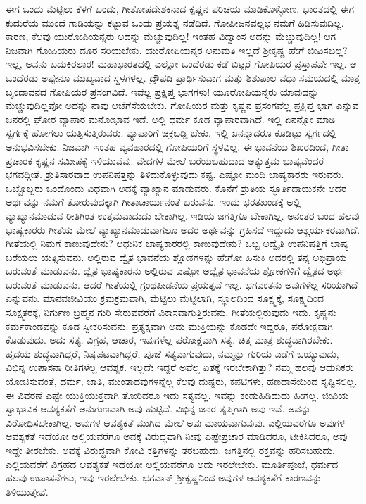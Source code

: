ಈಗ ಒಂದು ಮೆಟ್ಟಿಲು ಕೆಳಗೆ ಬಂದು, ಗೀತೋಪದೇಶಕನಾದ ಕೃಷ್ಣನ ಪರಿಚಯ ಮಾಡಿಕೊಳ್ಳೋಣ. ಭಾರತದಲ್ಲಿ ಈಗ ಕುದುರೆಯ ಮುಂದೆ ಗಾಡಿಯನ್ನು ಕಟ್ಟುವ ಒಂದು ಪ್ರಯತ್ನ ನಡೆದಿದೆ. ಗೋಪೀಜನವಲ್ಲಭ ನಮಗೆ ಹಿಡಿಸುವುದಿಲ್ಲ. ಕಾರಣ, ಕೆಲವು ಯುರೋಪಿಯನ್ನರು ಅದನ್ನು ಮೆಚ್ಚುವುದಿಲ್ಲ! ಇಂತಹ ವಿದ್ವಾಂಸ ಅದನ್ನು ಮೆಚ್ಚುವುದಿಲ್ಲ! ಆಗ ನಿಜವಾಗಿ ಗೋಪಿಯರು ದೂರ ಸರಿಯಬೇಕು. ಯುರೋಪಿಯನ್ನರ ಅನುಮತಿ ಇಲ್ಲದೆ ಶ‍್ರೀಕೃಷ್ಣ ಹೇಗೆ ಜೀವಿಸಬಲ್ಲ? ಇಲ್ಲ, ಅವನು ಬದುಕಿರಲಾರ! ಮಹಾಭಾರತದಲ್ಲಿ ಎಲ್ಲೋ ಒಂದೆರಡು ಕಡೆ ಬಿಟ್ಟರೆ ಗೋಪಿಯರ ಪ್ರಸ್ತಾಪವೇ ಇಲ್ಲ. ಆ ಒಂದೆರಡು ಅಷ್ಟೇನೂ ಮುಖ್ಯವಾದ ಸ್ಥಳಗಳಲ್ಲ. ದ್ರೌಪದಿ ಪ್ರಾರ್ಥಿಸುವಾಗ ಮತ್ತು ಶಿಶುಪಾಲ ವಧಾ ಸಮಯದಲ್ಲಿ ಮಾತ್ರ ಬೃಂದಾವನದ ಗೋಪಿಯರ ಪ್ರಸಂಗವಿದೆ. ಇವೆಲ್ಲ ಪ್ರಕ್ಷಿಪ್ತ ಭಾಗಗಳು! ಯೂರೋಪಿಯನ್ನರು ಯಾವುದನ್ನು ಮೆಚ್ಚುವುದಿಲ್ಲವೋ ಅದನ್ನು ನಾವು ಆಚೆಗೆಸೆಯಬೇಕು. ಗೋಪಿಯರ ಮತ್ತು ಕೃಷ್ಣನ ಪ್ರಸಂಗವೆಲ್ಲ ಪ್ರಕ್ಷಿಪ್ತ ಭಾಗ ಎನ್ನುವ ಜನರಲ್ಲಿ ಘೋರ ವ್ಯಾಪಾರ ಮನೋಭಾವ ಇದೆ. ಅಲ್ಲಿ ಧರ್ಮ ಕೂಡ ವ್ಯಾಪಾರವಾಗಿದೆ. ಇಲ್ಲಿ ಏನನ್ನೋ ಮಾಡಿ ಸ್ವರ್ಗಕ್ಕೆ ಹೋಗಲು ಯತ್ನಿಸುತ್ತಿರುವರು. ವ್ಯಾಪಾರಿಗೆ ಚಕ್ರಬಡ್ಡಿ ಬೇಕು. ಇಲ್ಲಿ ಏನನ್ನಾದರೂ ಕೂಡಿಟ್ಟು ಸ್ವರ್ಗದಲ್ಲಿ ಅನುಭವಿಸಬೇಕು. ನಿಜವಾಗಿ ಇಂತಹ ವ್ಯವಹಾರದಲ್ಲಿ ಗೋಪಿಯರಿಗೆ ಸ್ಥಳವಿಲ್ಲ. ಈ ಭಾವನೆಯ ಶಿಖರದಿಂದ, ಗೀತಾ ಪ್ರಚಾರಕ ಕೃಷ್ಣನ ಸಮೀಪಕ್ಕೆ ಇಳಿಯುವೆವು. ವೇದಗಳ ಮೇಲೆ ಬರೆಯಬಹುದಾದ ಅತ್ಯುತ್ತಮ ಭಾಷ್ಯವೆಂದರೆ ಭಗವದ್ಗೀತೆ. ಶ್ರುತಿಸಾರವಾದ ಉಪನಿಷತ್ತನ್ನು ತಿಳಿದುಕೊಳ್ಳುವುದು ಕಷ್ಟ. ಎಷ್ಟೋ ಮಂದಿ ಭಾಷ್ಯಕಾರರು ಇರುವರು. ಒಬ್ಬೊಬ್ಬರು ಒಂದೊಂದು ವಿಧವಾಗಿ ಅದಕ್ಕೆ ವ್ಯಾಖ್ಯಾನ ಮಾಡುವರು. ಕೊನೆಗೆ ಶ್ರುತಿಯ ಸ್ಫೂರ್ತಿದಾಯಕನೇ ಅದರ ಅರ್ಥವನ್ನು ನಮಗೆ ತೋರುವುದಕ್ಕಾಗಿ ಗೀತಾಚಾರ್ಯನಂತೆ ಬರುವನು. ಇಂದು ಭರತಖಂಡಕ್ಕೆ ಅಲ್ಲಿ ವ್ಯಾಖ್ಯಾನಮಾಡುವ ರೀತಿಗಿಂತ ಉತ್ತಮವಾದುದು ಬೇಕಾಗಿಲ್ಲ. ಇಡಿಯ ಜಗತ್ತಿಗೂ ಬೇಕಾಗಿಲ್ಲ. ಅನಂತರ ಬಂದ ಹಲವು ಭಾಷ್ಯಕಾರರು ಗೀತೆಯ ಮೇಲೆ ವ್ಯಾಖ್ಯಾನಮಾಡುವಾಗಲೂ ಅದರ ಅರ್ಥವನ್ನು ಗ್ರಹಿಸದೆ ಇದ್ದುದು ಆಶ್ಚರ್ಯಕರವಾಗಿದೆ. ಗೀತೆಯಲ್ಲಿ ನಿಮಗೆ ಕಾಣುವುದೇನು? ಆಧುನಿಕ ಭಾಷ್ಯಕಾರರಲ್ಲಿ ಕಾಣುವುದೇನು? ಒಬ್ಬ ಅದ್ವೈತಿ ಉಪನಿಷತ್ತಿಗೆ ಭಾಷ್ಯ ಬರೆಯಲು ಯತ್ನಿಸುವನು. ಅಲ್ಲಿರುವ ದ್ವೈತ ಭಾವನೆಯ ಶ್ಲೋಕಗಳನ್ನು ಹೇಗೋ ಹಿಸುಕಿ ಅದರಲ್ಲಿ ತನ್ನ ಅಭಿಪ್ರಾಯ ಬರುವಂತೆ ಮಾಡುವನು. ದ್ವೈತ ಭಾಷ್ಯಕಾರನು ಅಲ್ಲಿರುವ ಎಷ್ಟೋ ಅದ್ವೈತ ಭಾವನೆಯ ಶ್ಲೋಕಗಳಿಗೆ ದ್ವೈತದ ಅರ್ಥ ಬರುವಂತೆ ಮಾಡುವನು. ಆದರೆ ಗೀತೆಯಲ್ಲಿ ಗ್ರಂಥಪೀಡನೆಯ ಪ್ರಯತ್ನವೆ ಇಲ್ಲ. ಭಗವಂತನು ಅವುಗಳೆಲ್ಲ ಸರಿಯಾಗಿದೆ ಎನ್ನುವನು. ಮಾನವಜೀವಿಯು ಕ್ರಮಕ್ರಮವಾಗಿ, ಮೆಟ್ಟಿಲು ಮೆಟ್ಟಿಲಾಗಿ, ಸ್ಥೂಲದಿಂದ ಸೂಕ್ಷ್ಮಕ್ಕೆ, ಸೂಕ್ಷ್ಮದಿಂದ ಸೂಕ್ಷ್ಮತರಕ್ಕೆ, ನಿರ್ಗುಣ ಬ್ರಹ್ಮನ ಗುರಿ ಸೇರುವವರೆಗೆ ವಿಕಾಸವಾಗುತ್ತಿರುವನು. ಗೀತೆಯಲ್ಲಿರುವುದು ಇದು. ಕೃಷ್ಣನು ಕರ್ಮಕಾಂಡವನ್ನು ಕೂಡ ಸ್ವೀಕರಿಸುವನು. ಪ್ರತ್ಯಕ್ಷವಾಗಿ ಅದು ಮುಕ್ತಿಯನ್ನು ಕೊಡದೇ ಇದ್ದರೂ, ಪರೋಕ್ಷವಾಗಿ ಕೊಡುವುದು. ಅದು ಸತ್ಯ. ವಿಗ್ರಹ, ಆಚಾರ, ಇವುಗಳೆಲ್ಲ ಪರೋಕ್ಷವಾಗಿ ಸತ್ಯ. ಚಿತ್ತ ಮಾತ್ರ ಶುದ್ಧವಾಗಿರಬೇಕು. ಹೃದಯ ಶುದ್ಧವಾಗಿದ್ದರೆ, ನಿಷ್ಕಪಟವಾಗಿದ್ದರೆ, ಪೂಜೆ ಸತ್ಯವಾಗುವುದು, ನಮ್ಮನ್ನು ಗುರಿಯ ಎಡೆಗೆ ಒಯ್ಯುವುದು, ವಿಭಿನ್ನ ಉಪಾಸನಾ ರೀತಿಗಳೆಲ್ಲ ಆವಶ್ಯಕ. ಇಲ್ಲದೇ ಇದ್ದರೆ ಅವೆಲ್ಲ ಏತಕ್ಕೆ ಇರಬೇಕಾಗಿತ್ತು? ನಮ್ಮ ಹಲವು ಆಧುನಿಕರು ಯೋಚಿಸುವಂತೆ, ಧರ್ಮ, ಜಾತಿ, ಮುಂತಾದವುಗಳನ್ನೆಲ್ಲ ಕೆಲವು ದುಷ್ಟರು, ಕಪಟಿಗಳು, ಹಣದಾಸೆಯಿಂದ ಸೃಷ್ಟಿಸಲಿಲ್ಲ. ಈ ವಿವರಣೆ ಎಷ್ಟೇ ಯುಕ್ತಿಯುಕ್ತವಾಗಿ ತೋರಿದರೂ ಇದು ಸತ್ಯವಲ್ಲ. ಇವನ್ನು ಕಂಡುಹಿಡಿದುದು ಹೀಗಲ್ಲ. ಜೀವಿಯ ಸ್ವಾಭಾವಿಕ ಆವಶ್ಯಕತೆಗೆ ಅನುಗುಣವಾಗಿ ಅವು ಹುಟ್ಟಿವೆ. ವಿಭಿನ್ನ ಜನರ ತೃಪ್ತಿಗಾಗಿ ಅವು ಇವೆ. ಅವನ್ನು ವಿರೋಧಿಸಬೇಕಾಗಿಲ್ಲ. ಅವುಗಳ ಆವಶ್ಯಕತೆ ಮುಗಿದ ಮೇಲೆ ಅವು ಮಾಯವಾಗುವುವು. ಎಲ್ಲಿಯವರೆಗೂ ಅವುಗಳ ಆವಶ್ಯಕತೆ ಇದೆಯೋ ಅಲ್ಲಿಯವರೆಗೂ ಅವಕ್ಕೆ ವಿರುದ್ಧವಾಗಿ ನೀವು ಎಷ್ಟೇಪ್ರಚಾರ ಮಾಡಿದರೂ, ಟೀಕಿಸಿದರೂ, ಅವು ಇದ್ದೇ ತೀರಬೇಕು. ಅವಕ್ಕೆ ವಿರುದ್ಧವಾಗಿ ಕೋವಿ ಕತ್ತಿಗಳನ್ನು ತರಬಹುದು. ಜಗತ್ತಿನಲ್ಲಿ ರಕ್ತವನ್ನು ಹರಿಸಬಹುದು. ಎಲ್ಲಿಯವರೆಗೆ ವಿಗ್ರಹದ ಆವಶ್ಯಕತೆ ಇದೆಯೋ ಅಲ್ಲಿಯವರೆಗೂ ಅದು ಇರಲೇಬೇಕು. ಮೂರ್ತಿಪೂಜೆ, ಧರ್ಮದ ಹಲವು ಉಪಾಸನೆಗಳು, ಇವು ಇರಲೇಬೇಕು. ಭಗವಾನ್​ ಶ‍್ರೀಕೃಷ್ಣನಿಂದ ಅವುಗಳ ಆವಶ್ಯಕತೆಗೆ ಕಾರಣವನ್ನು ತಿಳಿಯುತ್ತೇವೆ.

